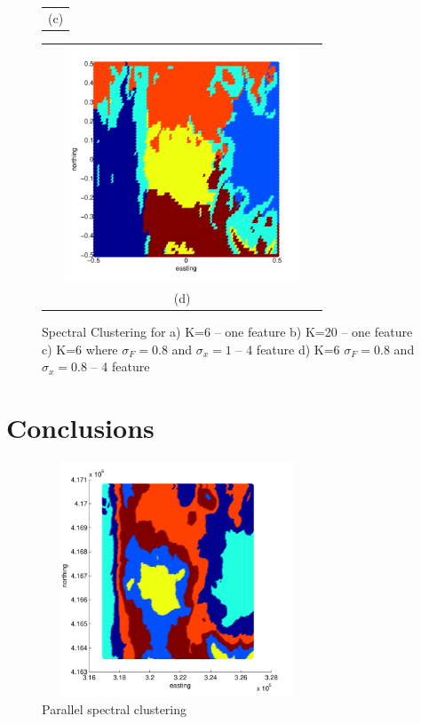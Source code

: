 \documentclass[12pt,letterpaper]{article}
\begin{document}
\begin{figure}[H]
\begin{minipage}[b]{0.5\textwidth}
\begin{tabular}{c}
      (c)
    \end{tabular}
  \end{minipage}
  \begin{minipage}{0.5\textwidth}
    \begin{tabular}{c}
      \includegraphics[width=8cm,height=7cm,keepaspectratio]{figs/Spectral1.pdf}\\
      (d)
    \end{tabular}
  \end{minipage}
   \caption{Spectral Clustering for a) K=6 -- one feature b) K=20 -- one feature c) K=6  where $\sigma_F = 0.8$ and $\sigma_x = 1$ -- 4 feature d) K=6  $\sigma_F = 0.8$ and $\sigma_x = 0.8$ -- 4 feature}\label{fig:fig4}
\end{figure}


\section{Conclusions}

\begin{figure}[H]
\begin{centering}
 \includegraphics[width=8cm,height=7cm,keepaspectratio]{figs/Spectral_parallel.pdf}
 \caption{Parallel spectral clustering}
 \end{centering}
 \end{figure}
\end{document}
